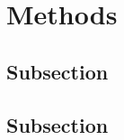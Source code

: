 \section{Methods}
\label{sec:methods}
\lipsum[8]

\subsection{Subsection}
\lipsum[8]

\subsection{Subsection}
\lipsum[8]